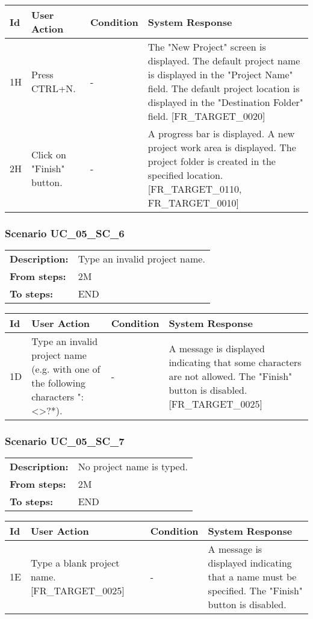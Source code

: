 \documentclass[a4paper,11pt]{article}
\newcommand{\bl}{\\ \hline}
\begin{document}
\begin{tabular}{|p{0.8in}|p{1.6in}|p{1.6in}|p{1.6in}|}
\hline
Id & User Action & Condition & System Response  \bl 
1H & Press CTRL+N. & - & The "New Project" screen is displayed. The default project name is displayed in the "Project Name" field. The default project location is displayed in the "Destination Folder" field. [FR_TARGET_0020] \bl 
2H & Click on "Finish" button. & - & A progress bar is displayed. A new project work area is displayed. The project folder is created in the specified location. [FR_TARGET_0110, FR_TARGET_0010] \bl 
\end{tabular}
\subsubsection*{Scenario UC_05_SC_6}
\begin{tabular}{p{1in}p{4in}}
{\bf Description:} & Type an invalid project name. \\
{\bf From steps:} & 2M \\
{\bf To steps:} & END \\
\end{tabular}
 
\begin{tabular}{|p{0.8in}|p{1.6in}|p{1.6in}|p{1.6in}|}
\hline
Id & User Action & Condition & System Response  \bl 
1D & Type an invalid project name (e.g. with one of the following characters ":\/<>?*). & - & A message is displayed indicating that some characters are not allowed. The "Finish" button is disabled. [FR_TARGET_0025] \bl 
\end{tabular}
\subsubsection*{Scenario UC_05_SC_7}
\begin{tabular}{p{1in}p{4in}}
{\bf Description:} & No project name is typed. \\
{\bf From steps:} & 2M \\
{\bf To steps:} & END \\
\end{tabular}
 
\begin{tabular}{|p{0.8in}|p{1.6in}|p{1.6in}|p{1.6in}|}
\hline
Id & User Action & Condition & System Response  \bl 
1E & Type a blank project name. [FR_TARGET_0025] & - & A message is displayed indicating that a name must be specified. The "Finish" button is disabled. \bl 
\end{tabular}
\end{document}
